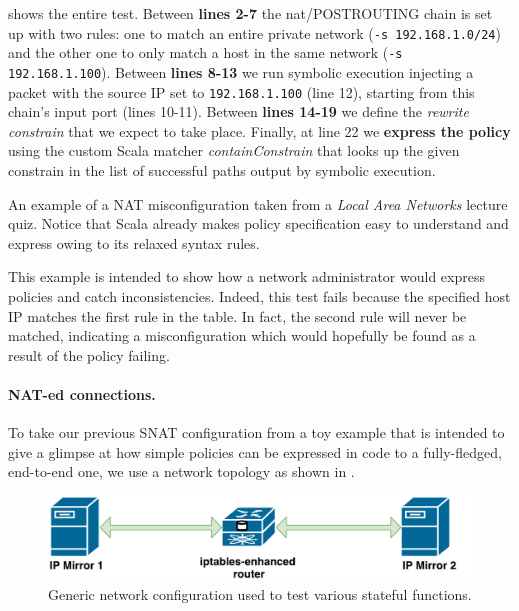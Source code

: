  shows the entire test.  Between
\textbf{lines 2-7} the nat/POSTROUTING chain is set up with two rules: one to
match an entire private network (\lstinline{-s 192.168.1.0/24}) and the other
one to only match a host in the  same network (\lstinline{-s 192.168.1.100}).
Between \textbf{lines 8-13} we run symbolic execution injecting a packet with
the source IP set to \lstinline{192.168.1.100} (line 12), starting from this
chain's input port (lines 10-11).  Between \textbf{lines 14-19} we define the
\emph{rewrite constrain} that we expect to take place.  Finally, at line 22 we
\textbf{express the policy} using the custom Scala matcher
\emph{containConstrain} that looks up the given constrain in the list of
successful paths output by symbolic execution.

\begin{listing}[H]
  \caption{An example of a NAT misconfiguration taken from a \emph{Local Area
  Networks} lecture quiz.  Notice that Scala already makes policy specification
  easy to understand and express owing to its relaxed syntax rules.}
  \label{lst:unreachable-rule}
\end{listing}

This example is intended to show how a network administrator would express
policies and catch inconsistencies.  Indeed, this test fails because the
specified host IP matches the first rule in the table.  In fact, the second
rule will never be matched, indicating a misconfiguration which would hopefully
be found as a result of the policy failing.

\paragraph{NAT-ed connections.}
To take our previous SNAT configuration from a toy example that is intended to
give a glimpse at how simple policies can be expressed in code to a
fully-fledged, end-to-end one, we use a network topology as shown in
.

\begin{figure}[h]
  \centering
  \captionsetup{justification=centering}
  \includegraphics[scale=0.5]{assets/img/source-nating}
  \caption{Generic network configuration used to test various stateful
  functions.}
  \label{fig:source-nating}
\end{figure}

